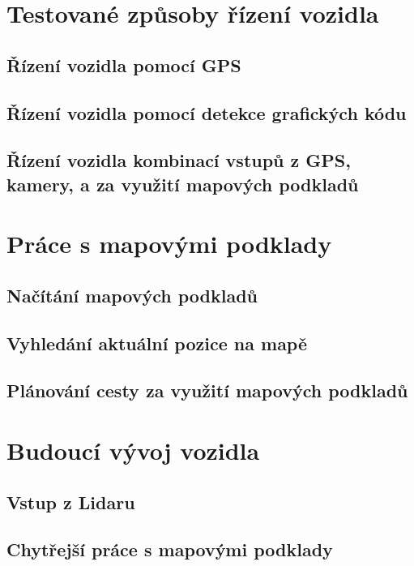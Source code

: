\documentclass[czech,bachelor,dept460,male,cpp,cpdeclaration]{diploma}
\begin{document}
\section{Testované způsoby řízení vozidla}

\subsection{Řízení vozidla pomocí GPS} \label{gps-failure}

\subsection{Řízení vozidla pomocí detekce grafických kódu}

\subsection{Řízení vozidla kombinací vstupů z GPS, kamery, a za využití mapových podkladů}

\section{Práce s mapovými podklady} \label{osm-chapter}

\subsection{Načítání mapových podkladů}

\subsection{Vyhledání aktuální pozice na mapě}

\subsection{Plánování cesty za využití mapových podkladů}

\section{Budoucí vývoj vozidla}

\subsection{Vstup z Lidaru}

\subsection{Chytřejší práce s mapovými podklady}
\end{document}
